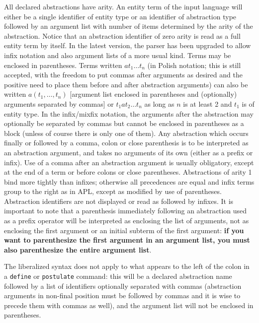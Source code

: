 All declared abstractions have arity.  An entity term of the input language will either be a single identifier of entity type or an identifier of abstraction type followed by an argument list with number of items determined by the arity of the abstraction.  Notice that an abstraction identifier of zero arity is read as a full entity term by itself.   In the latest version, the parser has been upgraded to allow infix notation and also argument lists of a more usual kind.  Terms may be enclosed in parentheses.  Terms written $at_1\ldots t_n$ (in Polish notation; this is still accepted, with the freedom to put commas after arguments as desired and the positive need to place them before and after abstraction arguments) can also be written $a(t_1,\ldots,t_n)$   [argument list enclosed in parentheses and (optionally) arguments separated by commas] or $t_1 a t_2\ldots t_n$ as long as $n$ is at least 2 and $t_1$ is of entity type.   In the infix/mixfix notation, the arguments
after the abstraction may optionally be separated by commas but cannot be enclosed in parentheses as a block (unless of course there is only one of them).   Any abstraction which occurs finally or followed by a comma, colon or close parenthesis is to be interpreted as an abstraction argument, and takes no arguments of its own (either as a prefix or infix).   Use of a comma after an abstraction argument is usually obligatory, except at the end of a term or before colons or close parentheses.  Abstractions of arity 1 bind more tightly than infixes; otherwise all precedences are equal and infix terms group to the right as in APL, except as modified by use of parentheses.  Abstraction identifiers are not displayed or read as followed by infixes.  It is important
to note that a parenthesis immediately following an abstraction used as a prefix operator will be interpreted as enclosing the list of arguments, not as enclosing the first argument or an initial subterm of the first argument:  {\bf if you want to parenthesize the first argument in an argument list, you must also parenthesize the entire argument list}.

The liberalized syntax does not apply to what appears to the left of the colon in a {\tt define} or {\tt postulate} command:  this will be a declared abstraction name followed by
a list of identifiers optionally separated with commas (abstraction arguments in non-final position must be followed by commas and it is wise to precede them with commas as well), and the argument list will not be enclosed in parentheses.

